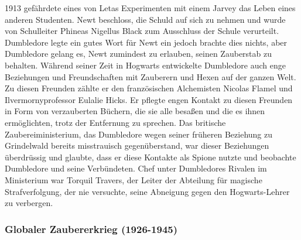 \documentclass[a4paper, 10pt]{article}
\begin{document}
\newline
{}  
1913 gefährdete eines von Letas Experimenten mit einem Jarvey das Leben eines anderen Studenten. Newt beschloss, die Schuld auf sich zu nehmen und wurde von Schulleiter Phineas Nigellus Black zum Ausschluss der Schule verurteilt. Dumbledore legte ein gutes Wort für Newt ein jedoch brachte dies nichts, aber Dumbledore gelang es, Newt zumindest zu erlauben, seinen Zauberstab zu behalten.
\vspace{10pt}
\newline
{}  
Während seiner Zeit in Hogwarts entwickelte Dumbledore auch enge Beziehungen und Freundschaften mit Zauberern und Hexen auf der ganzen Welt. Zu diesen Freunden zählte er den französischen Alchemisten Nicolas Flamel und Ilvermornyprofessor Eulalie Hicks. Er pflegte engen Kontakt zu diesen Freunden in Form von verzauberten Büchern, die sie alle besaßen und die es ihnen ermöglichten, trotz der Entfernung zu sprechen. Das britische Zaubereiministerium, das Dumbledore wegen seiner früheren Beziehung zu Grindelwald bereits misstrauisch gegenüberstand, war dieser Beziehungen überdrüssig und glaubte, dass er diese Kontakte als Spione nutzte und beobachte Dumbledore und seine Verbündeten. Chef unter Dumbledores Rivalen im Ministerium war Torquil Travers, der Leiter der Abteilung für magische Strafverfolgung, der nie versuchte, seine Abneigung gegen den Hogwarts-Lehrer zu verbergen.

\subsubsection*{\large Globaler Zaubererkrieg (1926-1945)}
\end{document}
